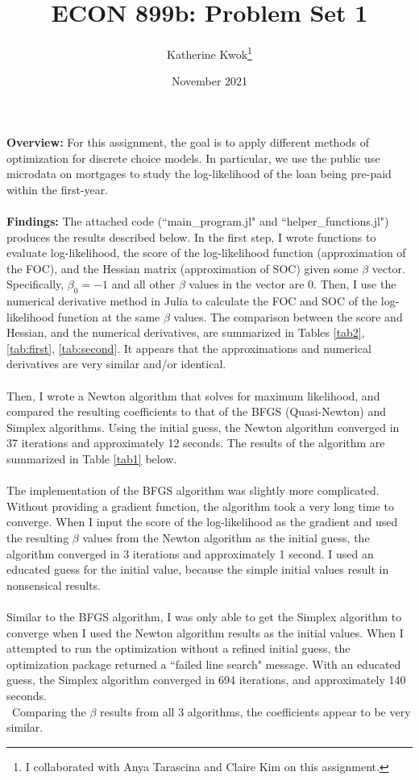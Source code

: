 \documentclass[12pt]{article}
\title{ECON 899b: Problem Set 1}
\author{Katherine Kwok\footnote{I collaborated with Anya Tarascina and Claire Kim on this assignment.}}
\date{November 2021}
\begin{document}
\maketitle
\noindent \textbf{Overview:} For this assignment, the goal is to apply different methods of optimization for discrete choice models. In particular, we use the public use microdata on mortgages to study the log-likelihood of the loan being pre-paid within the first-year. \\\\

\noindent \textbf{Findings:} The attached code (``main\_program.jl" and ``helper\_functions.jl") produces the results described below. In the first step, I wrote functions to evaluate log-likelihood, the score of the log-likelihood function (approximation of the FOC), and the Hessian matrix (approximation of SOC) given some $\beta$ vector. Specifically, $\beta_0 = -1$ and all other $\beta$ values in the vector are 0. Then, I use the numerical derivative method in Julia to calculate the FOC and SOC of the log-likelihood function at the same $\beta$ values. The comparison between the score and Hessian, and the numerical derivatives, are summarized in Tables \ref{tab2}, \ref{tab:first}, \ref{tab:second}. It appears that the approximations and numerical derivatives are very similar and/or identical. \\\\
Then, I wrote a Newton algorithm that solves for maximum likelihood, and compared the resulting coefficients to that of the BFGS (Quasi-Newton) and Simplex algorithms. Using the initial guess, the Newton algorithm converged in 37 iterations and approximately 12 seconds. The results of the algorithm are summarized in Table \ref{tab1} below. \\\\
The implementation of the BFGS algorithm was slightly more complicated. Without providing a gradient function, the algorithm took a very long time to converge. When I input the score of the log-likelihood as the gradient and used the resulting $\beta$ values from the Newton algorithm as the initial guess, the algorithm converged in 3 iterations and approximately 1 second. I used an educated guess for the initial value, because the simple initial values result in nonsensical results. \\\\
Similar to the BFGS algorithm, I was only able to get the Simplex algorithm to converge when I used the Newton algorithm results as the initial values. When I attempted to run the optimization without a refined initial guess, the optimization package returned a ``failed line search" message. With an educated guess, the Simplex algorithm converged in 694 iterations, and approximately 140 seconds. \\\
Comparing the $\beta$ results from all 3 algorithms, the coefficients appear to be very similar.
\end{document}
